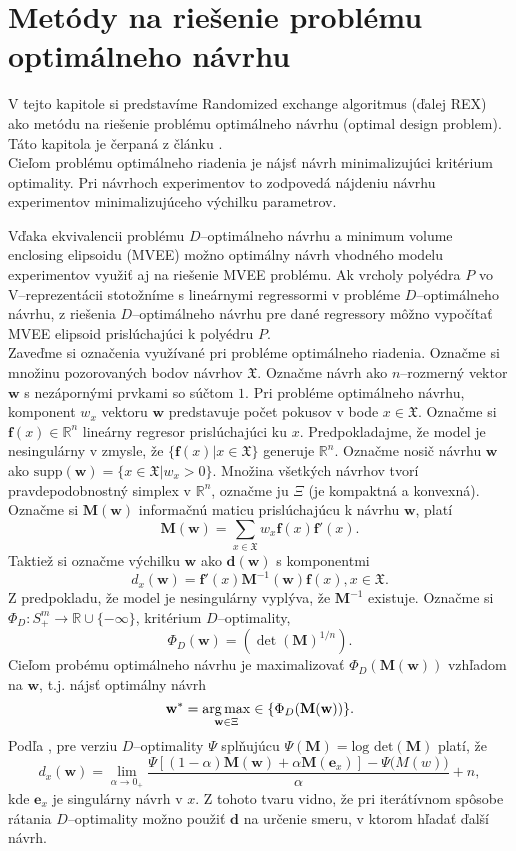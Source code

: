 \chapter{Metódy na riešenie problému optimálneho návrhu}

V tejto kapitole si predstavíme Randomized exchange algoritmus \cite{rex_harman} (ďalej REX) ako metódu na riešenie problému optimálneho návrhu (optimal design problem). Táto kapitola je čerpaná z článku \cite{rex_harman}. \\

Cieľom problému optimálneho riadenia je nájsť návrh minimalizujúci kritérium optimality. Pri návrhoch experimentov to zodpovedá nájdeniu návrhu experimentov minimalizujúceho výchilku parametrov.

Vďaka ekvivalencii problému $D$--optimálneho návrhu a minimum volume enclosing elipsoidu (MVEE) možno optimálny návrh vhodného modelu experimentov využiť aj na riešenie MVEE problému. Ak vrcholy polyédra $P$ vo V--reprezentácii stotožníme s lineárnymi regressormi v probléme $D$--optimálneho návrhu, z riešenia $D$--optimálneho návrhu pre dané regressory môžno vypočítať MVEE elipsoid prislúchajúci k polyédru $P$.\\

Zaveďme si označenia využívané pri probléme optimálneho riadenia. Označme si množinu pozorovaných bodov návrhov $\mathfrak X$.
Označme návrh ako $n$--rozmerný vektor $\mathbf{w}$ s nezápornými prvkami so súčtom $1$. Pri probléme optimálneho návrhu, komponent $w_x$ vektoru $\mathbf{w}$ predstavuje počet pokusov v bode $x \in \mathfrak X$.
Označme si $\mathbf{f}(x)\in \mathbb{R}^n$ lineárny regresor prislúchajúci ku $x$. Predpokladajme, že model je nesingulárny v zmysle, že $\{ \mathbf f(x)|x \in \mathfrak X \}$ generuje $\mathbb R^n$.
Označme nosič návrhu $\mathbf{w}$ ako $\text{supp}(\mathbf{w})=\{x \in \mathfrak{X}| w_x>0\}$. 
Množina všetkých návrhov tvorí pravdepodobnostný simplex v $\mathbb{R}^n$, označme ju $\Xi$ (je kompaktná a konvexná).
Označme si $\mathbf{M(w)}$ informačnú maticu prislúchajúcu k návrhu $\mathbf w$, platí $$\mathbf{M(w)}=\sum_{x\in \mathfrak X}w_x \mathbf{f}(x)\mathbf{f'}(x).$$
Taktiež si označme výchilku $\mathbf w$ ako $\mathbf {d(w)}$ s komponentmi $$d_x(\mathbf w)=\mathbf {f'}(x)\mathbf M^{-1}(\mathbf w)\mathbf f(x), x \in \mathfrak X.$$ Z predpokladu, že model je nesingulárny vyplýva, že $\mathbf M^{-1}$ existuje.
Označme si $\Phi_D: S^m_+ \rightarrow \mathbb{R} \cup \{-\infty\}$, kritérium $D$--optimality, $$\Phi_D(\mathbf{w})=(\det(\mathbf{M})^{1/n}).$$
Cieľom probému optimálneho návrhu je maximalizovať $\Phi_D(\mathbf{M(w)})$ vzhľadom na $\mathbf w$, t.j. nájsť optimálny návrh $$\mathbf{w^*} = \operatorname*{arg\,max}_{\mathbf{w} \in \Xi} \in \{\Phi_D(\mathbf{M(w)})\}.$$ Podľa \cite{rex_harman}, pre verziu $D$--optimality $\Psi$ splňujúcu $\Psi(\mathbf M)= \text{log det}(\mathbf M)$ platí, že $$d_x(\mathbf w)= \lim_{\alpha \rightarrow 0_+} \frac{\Psi[(1-\alpha)\mathbf{M(w)}+\alpha\mathbf M(\mathbf e_x)]-\Psi\mathbf(M(w))}{\alpha}+n,$$ kde $\mathbf e_x$ je singulárny návrh v $x$. Z tohoto tvaru vidno, že pri iterátívnom spôsobe rátania $D$--optimality možno použiť $\mathbf d$ na určenie smeru, v ktorom hľadať ďalší návrh.

